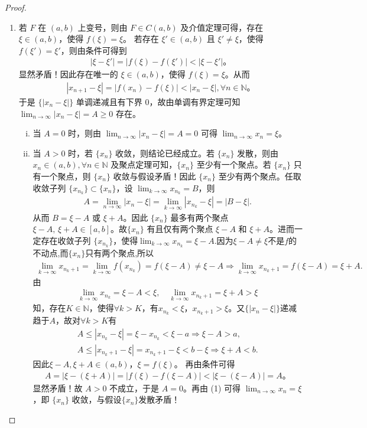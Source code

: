 \documentclass[../../main.tex]{subfiles}%
\begin{document}
\begin{proof}
\begin{enumerate}[(1)]
\item 若 $F$ 在 $(a, b)$ 上变号，则由 $F \in C(a, b)$ 及介值定理可得，存在 $\xi \in (a, b)$，使得 $f(\xi) = \xi$。
若存在 $\xi' \in (a, b)$ 且 $\xi' \neq \xi$，使得 $f(\xi') = \xi'$，则由条件可得到
\begin{align*}
|\xi - \xi'| = |f(\xi) - f(\xi')| < |\xi - \xi'|。
\end{align*}
显然矛盾！因此存在唯一的 $\xi \in (a, b)$，使得 $f(\xi) = \xi$。从而
\begin{align*}
|x_{n+1} - \xi| = |f(x_n) - f(\xi)| < |x_n - \xi|, \forall n \in \mathbb{N}。
\end{align*}
于是 $\{|x_n - \xi|\}$ 单调递减且有下界 $0$，故由单调有界定理可知 $\lim_{n \to \infty} |x_n - \xi| = A \geqslant 0$ 存在。
\begin{enumerate}[(i)]
\item 当 $A = 0$ 时，则由 $\lim_{n \to \infty} |x_n - \xi| = A = 0$ 可得 $\lim_{n \to \infty} x_n = \xi$。
\item 当 $A > 0$ 时，若 $\{x_n\}$ 收敛，则结论已经成立。若 $\{x_n\}$ 发散，则由 $x_n \in (a, b), \forall n \in \mathbb{N}$ 及聚点定理可知，$\{x_n\}$ 至少有一个聚点。若 $\{x_n\}$ 只有一个聚点，则 $\{x_n\}$ 收敛与假设矛盾！因此 $\{x_n\}$ 至少有两个聚点。任取收敛子列 $\{x_{n_k}\} \subset \{x_n\}$，设 $\lim_{k \to \infty} x_{n_k} = B$，则
\begin{align*}
A=\lim_{n\rightarrow \infty} |x_n-\xi |=\lim_{k\rightarrow \infty} |x_{n_k}-\xi |=|B-\xi |.
\end{align*}
从而 $B = \xi - A$ 或 $\xi + A$。因此 $\{x_n\}$ 最多有两个聚点 $\xi - A,\,\xi + A\in [a,b]$。故$\{x_n\}$ 有且仅有两个聚点 $\xi - A$ 和 $\xi + A$。进而一定存在收敛子列 $\{x_{n_k}\}$，使得$\lim_{k \to \infty} x_{n_k} = \xi - A.$因为$\xi-A\ne \xi$不是$f$的不动点,而$\{x_n\}$只有两个聚点,所以
\begin{align*}
\lim_{k\rightarrow \infty} x_{n_k+1}=\lim_{k\rightarrow \infty} f\left( x_{n_k} \right) =f\left( \xi -A \right) \ne \xi -A\Longrightarrow \lim_{k\rightarrow \infty} x_{n_k+1}=f(\xi -A)=\xi +A.
\end{align*}
由
\begin{align*}
\lim_{k\rightarrow \infty}x_{n_k}=\xi -A<\xi ,\quad \lim_{k\rightarrow \infty}x_{n_k+1}=\xi +A>\xi 
\end{align*}
知，存在$K\in \mathbb{N}$，使得$\forall k>K$，有$x_{n_k}<\xi$，$x_{n_k+1}>\xi$。又$\{| x_n-\xi |\}$递减趋于$A$，故对$\forall k>K$有
\begin{gather*}
A\leqslant | x_{n_k}-\xi |=\xi -x_{n_k}<\xi -a\Longrightarrow \xi -A>a,
\\
A\leqslant | x_{n_k+1}-\xi |=x_{n_k+1}-\xi <b-\xi \Longrightarrow \xi +A<b.
\end{gather*}
因此$\xi -A,\xi +A\in (a,b)$，$\xi =f(\xi)$。
再由条件可得
\begin{align*}
A = |\xi - (\xi + A)| = |f(\xi) - f(\xi - A)| < |\xi - (\xi - A)| = A。
\end{align*}
显然矛盾！故 $A > 0$ 不成立，于是 $A = 0$。再由 (1) 可得 $\lim_{n \to \infty} x_n = \xi$，即 $\{x_n\}$ 收敛，与假设$\{x_n\}$发散矛盾！
\end{enumerate}
\end{enumerate}


\end{proof}
\end{document}
